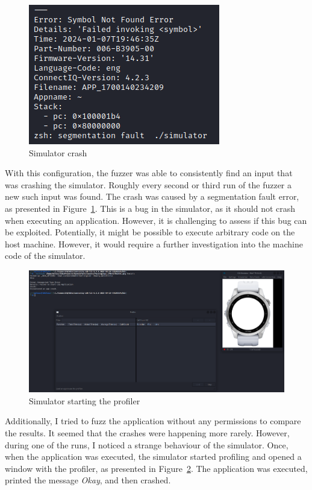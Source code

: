 \begin{figure}[h]
    \centering
    \includegraphics[width=0.4\linewidth]{../../images/simulator-crash}
    \caption{Simulator crash}
    \label{fig:simulator-crash}
\end{figure}

With this configuration, the fuzzer was able to consistently find an input that was crashing the simulator.
Roughly every second or third run of the fuzzer a new such input was found.
The crash was caused by a segmentation fault error, as presented in Figure~\ref{fig:simulator-crash}.
This is a bug in the simulator, as it should not crash when executing an application.
However, it is challenging to assess if this bug can be exploited.
Potentially, it might be possible to execute arbitrary code on the host machine.
However, it would require a further investigation into the machine code of the simulator.

\begin{figure}[h]
    \centering
    \includegraphics[width=1\linewidth]{../../images/simulator-bug-profiler}
    \caption{Simulator starting the profiler}
    \label{fig:simulator-bug-profiler}
\end{figure}

Additionally, I tried to fuzz the application without any permissions to compare the results.
It seemed that the crashes were happening more rarely.
However, during one of the runs, I noticed a strange behaviour of the simulator.
Once, when the application was executed, the simulator started profiling and opened a window with the profiler, as presented in Figure~\ref{fig:simulator-bug-profiler}.
The application was executed, printed the message \textit{Okay}, and then crashed.

